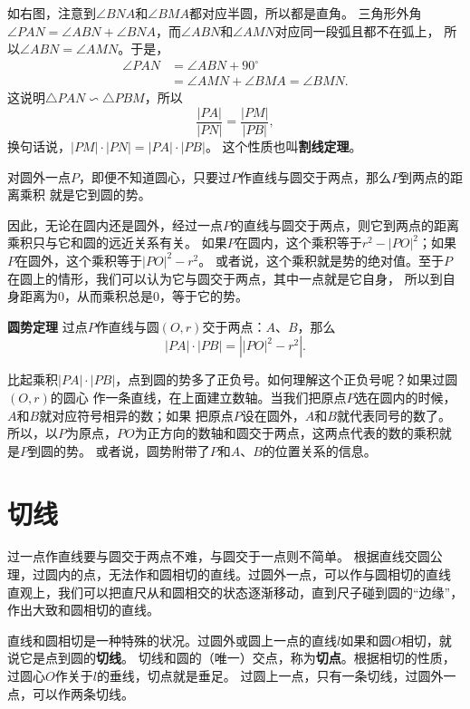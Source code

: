 \documentclass[12pt,UTF8]{ctexbook}
\begin{document}
如右图，注意到$\angle BNA$和$\angle BMA$都对应半圆，所以都是直角。
三角形外角$\angle PAN = \angle ABN + \angle BNA$，而$\angle ABN$和$\angle AMN$对应同一段弧且都不在弧上，
所以$\angle ABN = \angle AMN$。于是，
\begin{align*}
    \angle PAN &= \angle ABN + 90^\circ  \\
    &= \angle AMN + \angle BMA =\angle BMN. 
\end{align*}
这说明$\triangle PAN \backsim \triangle PBM$，所以
$$ \frac{|PA|}{|PN|} = \frac{|PM|}{|PB|},$$
换句话说，$|PM|\cdot |PN| = |PA|\cdot |PB|$。
这个性质也叫\textbf{割线定理}。

对圆外一点$P$，即便不知道圆心，只要过$P$作直线与圆交于两点，那么$P$到两点的距离乘积
就是它到圆的势。

因此，无论在圆内还是圆外，经过一点$P$的直线与圆交于两点，则它到两点的距离乘积只与它和圆的远近关系有关。
如果$P$在圆内，这个乘积等于$r^2 - |PO|^2$；如果$P$在圆外，这个乘积等于$|PO|^2 - r^2$。
或者说，这个乘积就是势的绝对值。至于$P$在圆上的情形，我们可以认为它与圆交于两点，其中一点就是它自身，
所以到自身距离为$0$，从而乘积总是$0$，等于它的势。

\begin{tm}\textbf{圆势定理}\label{tm:0-3-40}
    过点$P$作直线与圆$(O, r)$交于两点：$A$、$B$，那么
    $$ |PA| \cdot |PB| = \left||PO|^2 - r^2\right|. $$
\end{tm}

比起乘积$|PA| \cdot |PB|$，点到圆的势多了正负号。如何理解这个正负号呢？如果过圆$(O,r)$的圆心
作一条直线，在上面建立数轴。当我们把原点$P$选在圆内的时候，$A$和$B$就对应符号相异的数；如果
把原点$P$设在圆外，$A$和$B$就代表同号的数了。
所以，以$P$为原点，$PO$为正方向的数轴和圆交于两点，这两点代表的数的乘积就是$P$到圆的势。
或者说，圆势附带了$P$和$A$、$B$的位置关系的信息。


\section{切线}
过一点作直线要与圆交于两点不难，与圆交于一点则不简单。
根据直线交圆公理，过圆内的点，无法作和圆相切的直线。过圆外一点，可以作与圆相切的直线
直观上，我们可以把直尺从和圆相交的状态逐渐移动，直到尺子碰到圆的“边缘”，作出大致和圆相切的直线。

直线和圆相切是一种特殊的状况。过圆外或圆上一点的直线$l$如果和圆$O$相切，就说它是点到圆的\textbf{切线}。
切线和圆的（唯一）交点，称为\textbf{切点}。根据相切的性质，过圆心$O$作关于$l$的垂线，切点就是垂足。
过圆上一点，只有一条切线，过圆外一点，可以作两条切线。
\end{document}
